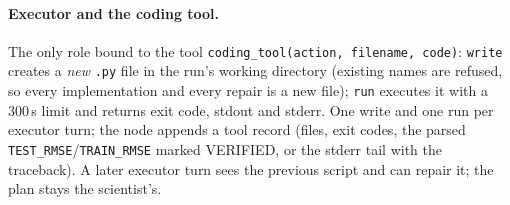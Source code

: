 \paragraph{Executor and the coding tool.} The only role bound to the tool \texttt{coding\_tool(action, filename, code)}:
\texttt{write} creates a \emph{new} \texttt{.py} file in the run's working directory (existing names are refused, so every
implementation and every repair is a new file); \texttt{run} executes it with a 300\,s limit and returns exit code, stdout and
stderr. One write and one run per executor turn; the node appends a tool record (files, exit codes, the parsed
\texttt{TEST\_RMSE}/\texttt{TRAIN\_RMSE} marked VERIFIED, or the stderr tail with the traceback). A later executor turn sees
the previous script and can repair it; the plan stays the scientist's.


